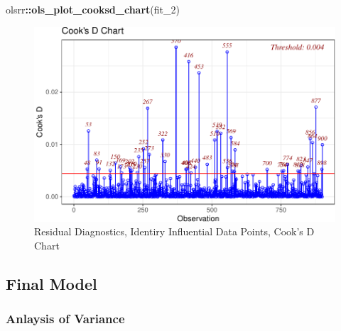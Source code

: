 \documentclass[
]{article}
\newenvironment{Shaded}{\begin{snugshade}}{\end{snugshade}}
\newcommand{\FunctionTok}[1]{\textcolor[rgb]{0.13,0.29,0.53}{\textbf{#1}}}
\newcommand{\NormalTok}[1]{#1}
\newcommand{\SpecialCharTok}[1]{\textcolor[rgb]{0.81,0.36,0.00}{\textbf{#1}}}
\begin{document}
\begin{Shaded}
\begin{Highlighting}[]
\NormalTok{olsrr}\SpecialCharTok{::}\FunctionTok{ols\_plot\_cooksd\_chart}\NormalTok{(fit\_2)}
\end{Highlighting}
\end{Shaded}

\begin{figure}[hb]

\includegraphics{Appendix_ex_weightloss_files/figure-latex/unnamed-chunk-77-1} \hfill{}

\caption{Residual Diagnostics, Identiry Influential Data Points, Cook's D Chart}\label{fig:unnamed-chunk-77}
\end{figure}

\clearpage

\hypertarget{final-model}{%
\subsection{Final Model}\label{final-model}}

\hypertarget{anlaysis-of-variance}{%
\subsubsection{Anlaysis of Variance}\label{anlaysis-of-variance}}
\end{document}
